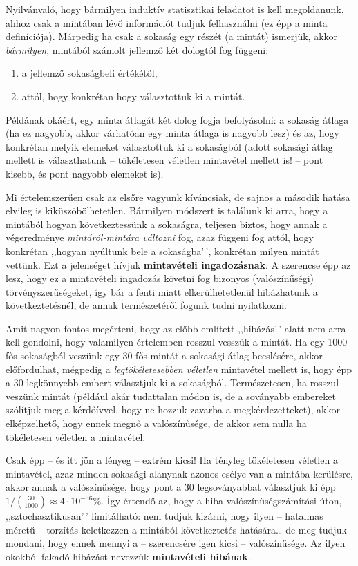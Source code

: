 \documentclass[
]{book}
\providecommand{\tightlist}{%
  \setlength{\itemsep}{0pt}\setlength{\parskip}{0pt}}
\begin{document}
Nyilvánvaló, hogy bármilyen induktív statisztikai feladatot is kell megoldanunk, ahhoz csak a mintában lévő információt tudjuk felhasználni (ez épp a minta definíciója). Márpedig ha csak a sokaság egy részét (a mintát) ismerjük, akkor \emph{bármilyen}, mintából számolt jellemző két dologtól fog függeni:

\begin{enumerate}
\def\labelenumi{\arabic{enumi}.}
\tightlist
\item
  a jellemző sokaságbeli értékétől,
\item
  attól, hogy konkrétan hogy választottuk ki a mintát.
\end{enumerate}

Példának okáért, egy minta átlagát két dolog fogja befolyásolni: a sokaság átlaga (ha ez nagyobb, akkor várhatóan egy minta átlaga is nagyobb lesz) és az, hogy konkrétan melyik elemeket választottuk ki a sokaságból (adott sokasági átlag mellett is választhatunk -- tökéletesen véletlen mintavétel mellett is! -- pont kisebb, és pont nagyobb elemeket is).

Mi értelemszerűen csak az elsőre vagyunk kíváncsiak, de sajnos a második hatása elvileg is kiküszöbölhetetlen. Bármilyen módszert is találunk ki arra, hogy a mintából hogyan következtessünk a sokaságra, teljesen biztos, hogy annak a végeredménye \emph{mintáról-mintára változni} fog, azaz függeni fog attól, hogy konkrétan ,,hogyan nyúltunk bele a sokaságba'\,', konkrétan milyen mintát vettünk. Ezt a jelenséget hívjuk \textbf{mintavételi ingadozásnak}. A szerencse épp az lesz, hogy ez a mintavételi ingadozás követni fog bizonyos (valószínűségi) törvényszerűségeket, így bár a fenti miatt elkerülhetetlenül hibázhatunk a következtetésnél, de annak természetéről fogunk tudni nyilatkozni.

Amit nagyon fontos megérteni, hogy az előbb említett ,,hibázás'\,' alatt nem arra kell gondolni, hogy valamilyen értelemben rosszul vesszük a mintát. Ha egy 1000 fős sokaságból veszünk egy 30 fős mintát a sokasági átlag becslésére, akkor előfordulhat, mégpedig a \emph{legtökéletesebben véletlen} mintavétel mellett is, hogy épp a 30 legkönnyebb embert választjuk ki a sokaságból. Természetesen, ha rosszul veszünk mintát (például akár tudattalan módon is, de a soványabb embereket szólítjuk meg a kérdőívvel, hogy ne hozzuk zavarba a megkérdezetteket), akkor elképzelhető, hogy ennek megnő a valószínűsége, de akkor sem nulla ha tökéletesen véletlen a mintavétel.

Csak épp -- és itt jön a lényeg -- extrém kicsi! Ha tényleg tökéletesen véletlen a mintavétel, azaz minden sokasági alanynak azonos esélye van a mintába kerülésre, akkor annak a valószínűsége, hogy pont a 30 legsoványabbat választjuk ki épp \(1/\binom{30}{1000}\approx 4\cdot 10^{-56}\)\%. Így értendő az, hogy a hiba valószínűségszámítási úton, ,,sztochasztikusan'\,' limitálható: nem tudjuk kizárni, hogy ilyen -- hatalmas méretű -- torzítás keletkezzen a mintából következtetés hatására\dots{} de meg tudjuk mondani, hogy ennek mennyi a -- szerencsére igen kicsi -- valószínűsége. Az ilyen okokból fakadó hibázást nevezzük \textbf{mintavételi hibának}.
\end{document}
